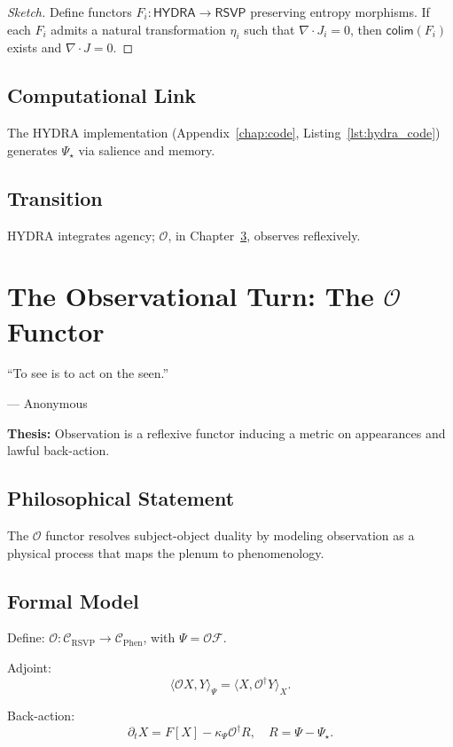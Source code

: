 \documentclass[12pt]{book}
\theoremstyle{definition}
\begin{document}
\begin{proof}[Sketch]
Define functors \(F_i: \textsf{HYDRA} \to \textsf{RSVP}\) preserving entropy morphisms. If each \(F_i\) admits a natural transformation \(\eta_i\) such that \(\nabla \cdot J_i = 0\), then \(\textsf{colim}(F_i)\) exists and \(\nabla \cdot J = 0\).
\end{proof}

\section{Computational Link}
The HYDRA implementation (Appendix~\ref{chap:code}, Listing~\ref{lst:hydra_code}) generates \(\Psi_\star\) via salience and memory.

\section{Transition}
HYDRA integrates agency; \(\mathcal{O}\), in Chapter~\ref{chap:observation}, observes reflexively.

\chapter{The Observational Turn: The \texorpdfstring{\(\mathcal{O}\)}{O} Functor}
\label{chap:observation}
\epigraph{``To see is to act on the seen.''}{--- Anonymous}

\textbf{Thesis:} Observation is a reflexive functor inducing a metric on appearances and lawful back-action.

\section{Philosophical Statement}
The \(\mathcal{O}\) functor resolves subject-object duality by modeling observation as a physical process that maps the plenum to phenomenology.

\section{Formal Model}
Define: \(\mathcal{O}: \mathcal{C}_{\text{RSVP}} \to \mathcal{C}_{\text{Phen}}\), with \(\Psi = \mathcal{O} \mathcal{F}\).

Adjoint:
\begin{equation}
\langle \mathcal{O}X, Y \rangle_\Psi = \langle X, \mathcal{O}^\dagger Y \rangle_X.
\end{equation}

Back-action:
\begin{equation}
\partial_t X = F[X] - \kappa_\Psi \mathcal{O}^\dagger R, \quad R = \Psi - \Psi_\star.
\end{equation}
\end{document}
